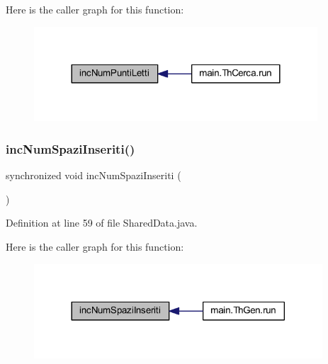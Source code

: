Here is the caller graph for this function\+:
\nopagebreak
\begin{figure}[H]
\begin{center}
\leavevmode
\includegraphics[width=300pt]{classmain_1_1_shared_data_aa3c9cc591cbe753063e4dd75f20cfade_icgraph}
\end{center}
\end{figure}
\mbox{\label{classmain_1_1_shared_data_a5d5262bdb021b4f0deab8fefdb4dfe40}} 
\subsubsection{\texorpdfstring{inc\+Num\+Spazi\+Inseriti()}{incNumSpaziInseriti()}}
{\footnotesize\ttfamily synchronized void inc\+Num\+Spazi\+Inseriti (\begin{DoxyParamCaption}{ }\end{DoxyParamCaption})}



Definition at line 59 of file Shared\+Data.\+java.

Here is the caller graph for this function\+:
\nopagebreak
\begin{figure}[H]
\begin{center}
\leavevmode
\includegraphics[width=305pt]{classmain_1_1_shared_data_a5d5262bdb021b4f0deab8fefdb4dfe40_icgraph}
\end{center}
\end{figure}
\mbox{\label{classmain_1_1_shared_data_a437c60e2bd2e1647fc60ed8ec7f6616e}} 
